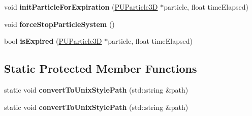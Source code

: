 \begin{DoxyCompactItemize}
void {\bfseries init\+Particle\+For\+Expiration} (\hyperlink{structPUParticle3D}{P\+U\+Particle3D} $\ast$particle, float time\+Elapsed)
\item 
\mbox{\label{classPUParticleSystem3D_a96545a2bd84998cd93728e8163d0c451}} 
void {\bfseries force\+Stop\+Particle\+System} ()
\item 
\mbox{\label{classPUParticleSystem3D_a7567220ce7b136db61d697fefe28ef0e}} 
bool {\bfseries is\+Expired} (\hyperlink{structPUParticle3D}{P\+U\+Particle3D} $\ast$particle, float time\+Elapsed)
\end{DoxyCompactItemize}
\subsection*{Static Protected Member Functions}
\begin{DoxyCompactItemize}
\item 
\mbox{\label{classPUParticleSystem3D_a3dd1688a80907fb995963b9c144e0935}} 
static void {\bfseries convert\+To\+Unix\+Style\+Path} (std\+::string \&path)
\item 
\mbox{\label{classPUParticleSystem3D_a135097779970fd68ee055309f8f4b0cf}} 
static void {\bfseries convert\+To\+Unix\+Style\+Path} (std\+::string \&path)
\end{DoxyCompactItemize}
